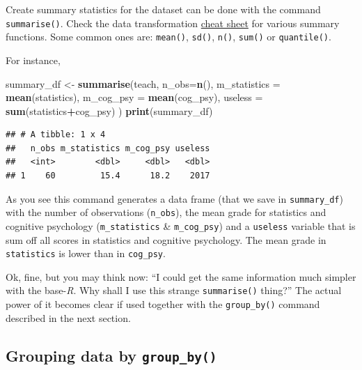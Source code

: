 \documentclass[
]{scrartcl}
\newenvironment{Shaded}{\begin{snugshade}}{\end{snugshade}}
\newcommand{\AttributeTok}[1]{\textcolor[rgb]{0.13,0.29,0.53}{#1}}
\newcommand{\FunctionTok}[1]{\textcolor[rgb]{0.13,0.29,0.53}{\textbf{#1}}}
\newcommand{\NormalTok}[1]{#1}
\newcommand{\OtherTok}[1]{\textcolor[rgb]{0.56,0.35,0.01}{#1}}
\newcommand{\SpecialCharTok}[1]{\textcolor[rgb]{0.81,0.36,0.00}{\textbf{#1}}}
\begin{document}
Create summary statistics for the dataset can be done with the command \texttt{summarise()}. Check the data transformation \protect\hyperlink{cheatsheets}{cheat sheet} for various summary functions. Some common ones are: \texttt{mean()}, \texttt{sd()}, \texttt{n()}, \texttt{sum()} or \texttt{quantile()}.

For instance,

\begin{Shaded}
\begin{Highlighting}[]
\NormalTok{summary\_df }\OtherTok{\textless{}{-}} \FunctionTok{summarise}\NormalTok{(teach,}
                \AttributeTok{n\_obs=}\FunctionTok{n}\NormalTok{(),}
                \AttributeTok{m\_statistics =} \FunctionTok{mean}\NormalTok{(statistics),}
                \AttributeTok{m\_cog\_psy =} \FunctionTok{mean}\NormalTok{(cog\_psy),}
                \AttributeTok{useless =} \FunctionTok{sum}\NormalTok{(statistics}\SpecialCharTok{+}\NormalTok{cog\_psy) )}
\FunctionTok{print}\NormalTok{(summary\_df)}
\end{Highlighting}
\end{Shaded}

\begin{verbatim}
## # A tibble: 1 x 4
##   n_obs m_statistics m_cog_psy useless
##   <int>        <dbl>     <dbl>   <dbl>
## 1    60         15.4      18.2    2017
\end{verbatim}

As you see this command generates a data frame (that we save in \texttt{summary\_df}) with the number of observations (\texttt{n\_obs}), the mean grade for statistics and cognitive psychology (\texttt{m\_statistics} \& \texttt{m\_cog\_psy}) and a \texttt{useless} variable that is sum off all scores in statistics and cognitive psychology. The mean grade in \texttt{statistics} is lower than in \texttt{cog\_psy}.

Ok, fine, but you may think now: ``I could get the same information much simpler with the base-\emph{R}. Why shall I use this strange \texttt{summarise()} thing?'' The actual power of it becomes clear if used together with the \texttt{group\_by()} command described in the next section.

\hypertarget{grouping-data-by-group_by}{%
\subsection{\texorpdfstring{Grouping data by \texttt{group\_by()}}{Grouping data by group\_by()}}\label{grouping-data-by-group_by}}
\end{document}
